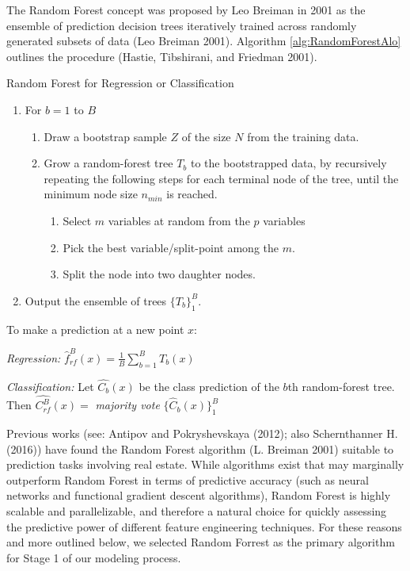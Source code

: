 \documentclass[12pt,]{article}
\begin{document}
The Random Forest concept was proposed by Leo Breiman in 2001 as the
ensemble of prediction decision trees iteratively trained across
randomly generated subsets of data (Leo Breiman 2001). Algorithm
\ref{alg:RandomForestAlo} outlines the procedure (Hastie, Tibshirani,
and Friedman 2001).

\begin{algorithm}
  \caption{Random Forest for Regression or Classification}\label{alg:RandomForestAlo}

\begin{enumerate}
  \item For $b = 1$ to $B$
  \begin{enumerate}
    \item Draw a bootstrap sample $Z$ of the size $N$ from the training data.
    \item Grow a random-forest tree $T_b$ to the bootstrapped data, by recursively repeating the following steps for each terminal node of the tree, until the minimum node size $n_{min}$ is reached.
  \begin{enumerate}
    \item Select $m$ variables at random from the $p$ variables
    \item Pick the best variable/split-point among the $m$.
    \item Split the node into two daughter nodes.
  \end{enumerate}
  \end{enumerate}
  \item Output the ensemble of trees $\{T_b\}_1^B$.
\end{enumerate}

To make a prediction at a new point $x$:

\textit{Regression:} $\hat{f}_{rf}^B(x) = \frac{1}{B}\sum_{b=1}^{B}T_b(x)$

\textit{Classification:} Let $\hat{C_b}(x)$ be the class prediction of the $b$th random-forest tree. Then $\hat{C_{rf}^B}(x)=$ \textit{majority vote} $\{\hat{C}_{b}(x)\}_1^B $

\end{algorithm}

Previous works (see: Antipov and Pokryshevskaya (2012); also
Schernthanner H. (2016)) have found the Random Forest algorithm (L.
Breiman 2001) suitable to prediction tasks involving real estate. While
algorithms exist that may marginally outperform Random Forest in terms
of predictive accuracy (such as neural networks and functional gradient
descent algorithms), Random Forest is highly scalable and
parallelizable, and therefore a natural choice for quickly assessing the
predictive power of different feature engineering techniques. For these
reasons and more outlined below, we selected Random Forrest as the
primary algorithm for Stage 1 of our modeling process.
\end{document}
